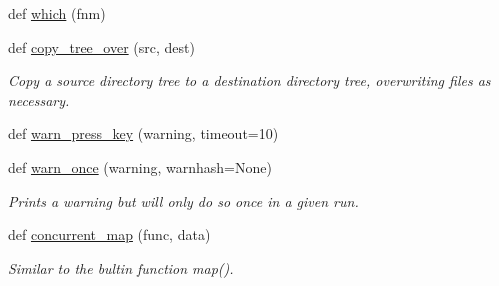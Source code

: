 \begin{DoxyCompactItemize}
def \hyperlink{namespacesrc_1_1nifty_a5025d057f4ba636315a5b5cb1bd6b00c}{which} (fnm)
\item 
def \hyperlink{namespacesrc_1_1nifty_ab89b066ca49605c05ffdaa8959512f15}{copy\+\_\+tree\+\_\+over} (src, dest)
\begin{DoxyCompactList}\small\item\em Copy a source directory tree to a destination directory tree, overwriting files as necessary. \end{DoxyCompactList}\item 
def \hyperlink{namespacesrc_1_1nifty_a6ae2951ba2a22420a11abda6be7e5454}{warn\+\_\+press\+\_\+key} (warning, timeout=10)
\item 
def \hyperlink{namespacesrc_1_1nifty_ab233937d3663f03a912737572c08da9d}{warn\+\_\+once} (warning, warnhash=None)
\begin{DoxyCompactList}\small\item\em Prints a warning but will only do so once in a given run. \end{DoxyCompactList}\item 
def \hyperlink{namespacesrc_1_1nifty_a6b0415de425fab71c5e3f33638423204}{concurrent\+\_\+map} (func, data)
\begin{DoxyCompactList}\small\item\em Similar to the bultin function map(). \end{DoxyCompactList}\end{DoxyCompactItemize}
